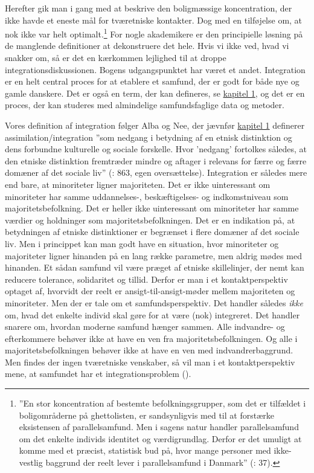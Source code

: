 \documentclass[
]{book}
\begin{document}
Herefter gik man i gang med at beskrive den boligmæssige koncentration, der ikke havde et eneste mål for tværetniske kontakter. Dog med en tilføjelse om, at nok ikke var helt optimalt.\footnote{''En stor koncentration af bestemte befolkningsgrupper, som det er tilfældet i boligområderne på ghettolisten, er sandsynligvis med til at forstærke eksistensen af parallelsamfund. Men i sagens natur handler parallelsamfund om det enkelte individs identitet og værdigrundlag. Derfor er det umuligt at komme med et præcist, statistisk bud på, hvor mange personer med ikke-vestlig baggrund der reelt lever i parallelsamfund i Danmark'' (: 37).} For nogle akademikere er den principielle løsning på de manglende definitioner at dekonstruere det hele. Hvis vi ikke ved, hvad vi snakker om, så er det en kærkommen lejlighed til at droppe integrationsdiskussionen. Bogens udgangspunktet har været et andet. Integration er en helt central proces for at etablere et samfund, der er godt for både nye og gamle danskere. Det er også en term, der kan defineres, se \hyperref[kap1]{kapitel 1}, og det er en proces, der kan studeres med almindelige samfundsfaglige data og metoder.

Vores definition af integration følger Alba og Nee, der jævnfør \hyperref[kap1]{kapitel 1} definerer assimilation/integration ''som nedgang i betydning af en etnisk distinktion og dens forbundne kulturelle og sociale forskelle. Hvor 'nedgang' fortolkes således, at den etniske distinktion fremtræder mindre og aftager i relevans for færre og færre domæner af det sociale liv'' (: 863, egen oversættelse). Integration er således mere end bare, at minoriteter ligner majoriteten. Det er ikke uinteressant om minoriteter har samme uddannelses-, beskæftigelses- og indkomstniveau som majoritetsbefolkning. Det er heller ikke uinteressant om minoriteter har samme værdier og holdninger som majoritetsbefolkningen. Det er en indikation på, at betydningen af etniske distinktioner er begrænset i flere domæner af det sociale liv. Men i princippet kan man godt have en situation, hvor minoriteter og majoriteter ligner hinanden på en lang række parametre, men aldrig mødes med hinanden. Et sådan samfund vil være præget af etniske skillelinjer, der nemt kan reducere tolerance, solidaritet og tillid. Derfor er man i et kontaktperspektiv optaget af, hvorvidt der reelt er ansigt-til-ansigt-møder mellem majoriteten og minoriteter. Men der er tale om et samfundsperspektiv. Det handler således \emph{ikke} om, hvad det enkelte individ skal gøre for at være (nok) integreret. Det handler snarere om, hvordan moderne samfund hænger sammen. Alle indvandre- og efterkommere behøver ikke at have en ven fra majoritetsbefolkningen. Og alle i majoritetsbefolkningen behøver ikke at have en ven med indvandrerbaggrund. Men findes der ingen tværetniske venskaber, så vil man i et kontaktperspektiv mene, at samfundet har et integrationsproblem ().
\end{document}
